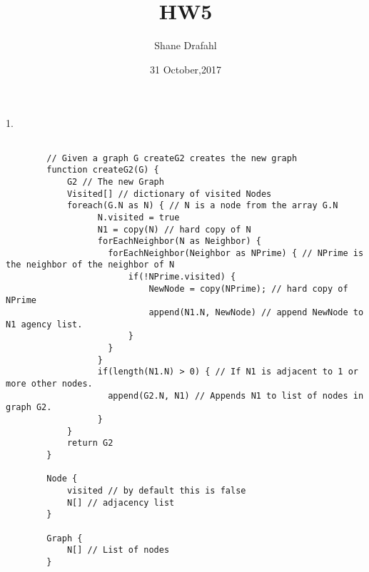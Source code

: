 \documentclass[11pt]{article}
\title{HW5}
\author{Shane Drafahl}
\date{31 October,2017}
\begin{document}
    \maketitle

    1. 
    
    \begin{verbatim}
       
        // Given a graph G createG2 creates the new graph
        function createG2(G) {
            G2 // The new Graph
            Visited[] // dictionary of visited Nodes
            foreach(G.N as N) { // N is a node from the array G.N   
                  N.visited = true
                  N1 = copy(N) // hard copy of N
                  forEachNeighbor(N as Neighbor) {
                    forEachNeighbor(Neighbor as NPrime) { // NPrime is the neighbor of the neighbor of N
                        if(!NPrime.visited) {
                            NewNode = copy(NPrime); // hard copy of NPrime
                            append(N1.N, NewNode) // append NewNode to N1 agency list.
                        }
                    }
                  }
                  if(length(N1.N) > 0) { // If N1 is adjacent to 1 or more other nodes.
                    append(G2.N, N1) // Appends N1 to list of nodes in graph G2.
                  }
            }
            return G2   
        }

        Node {
            visited // by default this is false
            N[] // adjacency list 
        }

        Graph {
            N[] // List of nodes 
        }

    \end{verbatim}
     

    
\end{document}
